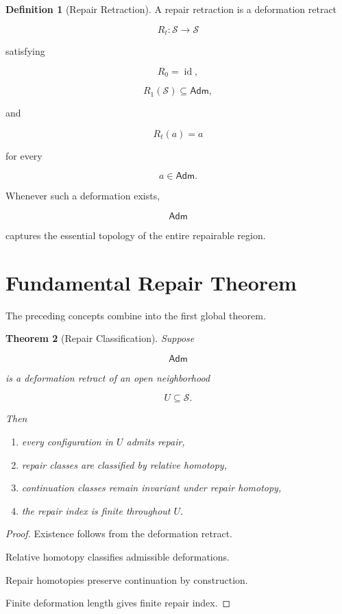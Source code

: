 \documentclass[11pt,oneside]{book}
\numberwithin{equation}{chapter}
\theoremstyle{definition}
\newtheorem{definition}{Definition}[chapter]
\theoremstyle{plain}
\newtheorem{theorem}[definition]{Theorem}
\DeclareMathOperator{\id}{id}
\newcommand{\State}{\mathcal{S}}
\newcommand{\Adm}{\mathsf{Adm}}
\begin{document}
\begin{definition}[Repair Retraction]

A repair retraction is a deformation retract

\[
R_t:
\State
\rightarrow
\State
\]

satisfying

\[
R_0=\id,
\]

\[
R_1(\State)\subseteq\Adm,
\]

and

\[
R_t(a)=a
\]

for every

\[
a
\in
\Adm.
\]

\end{definition}

Whenever such a deformation exists,

\[
\Adm
\]

captures the essential topology of the entire repairable region.

\section{Fundamental Repair Theorem}

The preceding concepts combine into the first global theorem.

\begin{theorem}[Repair Classification]

Suppose

\[
\Adm
\]

is a deformation retract of an open neighborhood

\[
U
\subseteq
\State.
\]

Then

\begin{enumerate}
\item every configuration in
\(U\)
admits repair,

\item repair classes are classified by relative homotopy,

\item continuation classes remain invariant under repair homotopy,

\item the repair index is finite throughout
\(U\).

\end{enumerate}

\end{theorem}

\begin{proof}

Existence follows from the deformation retract.

Relative homotopy classifies admissible deformations.

Repair homotopies preserve continuation by construction.

Finite deformation length gives finite repair index.

\end{proof}
\end{document}
